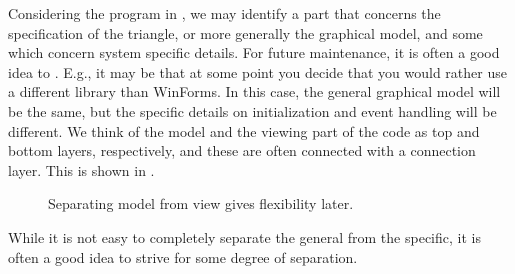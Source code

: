 \documentclass[fsharpNotes.tex]{subfiles}
\begin{document}
Considering the program in , we may identify a part that concerns the specification of the triangle, or more generally the graphical model, and some which concern system specific details. For future maintenance, it is often a good idea to . E.g., it may be that at some point you decide that you would rather use a different library than WinForms. In this case, the general graphical model will be the same, but the specific details on initialization and event handling will be different. We think of the model and the viewing part of the code as top and bottom layers, respectively, and these are often connected with a connection layer. This  is shown in .
\begin{figure}
  \centering
  \caption{Separating model from view gives flexibility later.}
  \label{fig:modelView}
\end{figure}
While it is not easy to completely separate the general from the specific, it is often a good idea to strive for some degree of separation.
\end{document}
